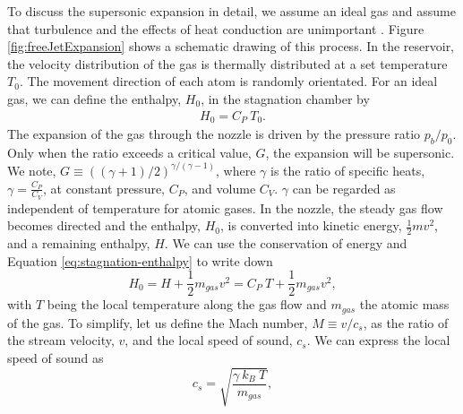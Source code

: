 %
To discuss the supersonic expansion in detail, we assume an ideal gas and assume that turbulence and the effects of heat conduction are unimportant \citep{Yamada-2001-SciDir,Haberland-1994-Springer}. Figure \ref{fig:freeJetExpansion} shows a schematic drawing of this process. In the reservoir, the velocity distribution of the gas is thermally distributed at a set temperature $T_{0}$. The movement direction of each atom is randomly orientated. For an ideal gas, we can define the enthalpy, $H_{0}$, in the stagnation chamber by
\begin{align}
H_{0}=C_{P}\ T_{0}.
\label{eq:stagnation-enthalpy}
\end{align}
The expansion of the gas through the nozzle is driven by the pressure ratio $p_{b}/p_{0}$. Only when the ratio exceeds a critical value, $G$, the expansion will be supersonic. We note, $G\equiv \left(\left(\gamma + 1\right)/2\right)^{\gamma/\left(\gamma - 1\right)}$, where $\gamma$ is the ratio of specific heats, $\gamma = \tfrac{C_{P}}{C_{V}}$, at constant pressure, $C_{P}$, and volume $C_{V}$. $\gamma$ can be regarded as independent of temperature for atomic gases. In the nozzle, the steady gas flow becomes directed and the enthalpy, $H_{0}$, is converted into kinetic energy, $\frac{1}{2}m v^{2}$, and a remaining enthalpy, $H$. We can use the conservation of energy and Equation \eqref{eq:stagnation-enthalpy} to write down
\begin{equation}
H_{0}=H+\frac{1}{2}m_{gas} v^{2} = C_{P}\ T+\frac{1}{2}m_{gas}v^{2},
\label{eq:local-temperature}
\end{equation}
with $T$ being the local temperature along the gas flow and $m_{gas}$ the atomic mass of the gas. To simplify, let us define the Mach number, $M\equiv v/c_{s}$, as the ratio of the stream velocity, $v$, and the local speed of sound, $c_{s}$. We can express the local speed of sound as
\begin{equation}
c_{s}=\sqrt{\frac{\gamma\ k_{B}\ T}{m_{gas}}},
\label{eq:local-speed-of-sound}
\end{equation}
